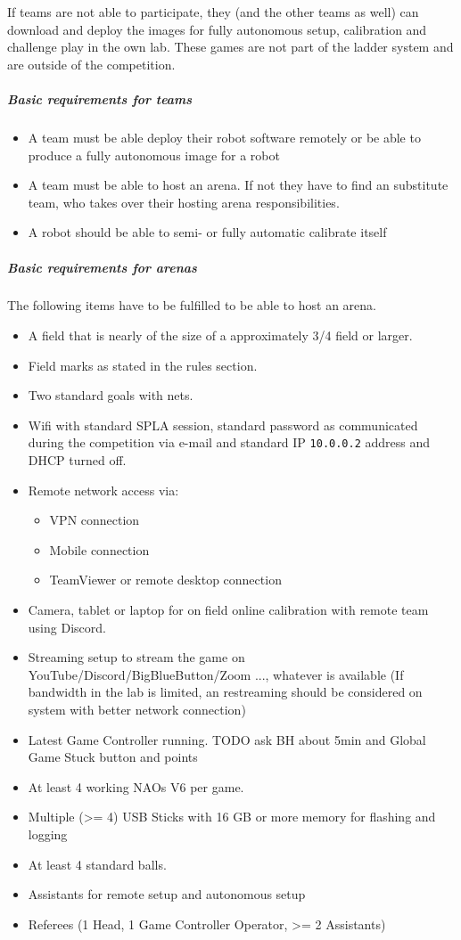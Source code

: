 If teams are not able to participate, they (and the other teams as well) can download and deploy the images for fully autonomous setup, calibration and challenge play in the own lab. These games are not part of the ladder system and are outside of the competition.

\subparagraph*{Basic requirements for teams}

\begin{itemize}
    \item A team must be able deploy their robot software remotely or be able to produce a fully autonomous image for a robot
    \item A team must be able to host an arena. If not they have to find an substitute team, who takes over their hosting arena responsibilities.
    \item A robot should be able to semi- or fully automatic calibrate itself
\end{itemize}

\subparagraph*{Basic requirements for arenas}

The following items have to be fulfilled to be able to host an arena.

\begin{itemize}
    \item A field that is nearly of the size of a approximately 3/4 field or larger.
    \item Field marks as stated in the rules section. 
    \item Two standard goals with nets.
    \item Wifi with standard SPL\textunderscore A session, standard password as communicated during the competition via e-mail and standard IP \texttt{10.0.0.2} address and DHCP turned off.
    \item Remote network access via:
    \begin{itemize}
        \item VPN connection
        \item Mobile connection
        \item TeamViewer or remote desktop connection
    \end{itemize}
    \item Camera, tablet or laptop for on field online calibration with remote team using Discord.
    \item Streaming setup to stream the game on YouTube/Discord/BigBlueButton/Zoom ..., whatever is available (If bandwidth in the lab is limited, an restreaming should be considered on system with better network connection)
    \item Latest Game Controller running. TODO ask BH about 5min and Global Game Stuck button and points 
    \item At least 4 working NAOs V6 per game.
    \item Multiple (>= 4) USB Sticks with 16 GB or more memory for flashing and logging 
    \item At least 4 standard balls.
    \item Assistants for remote setup and autonomous setup
    \item Referees (1 Head, 1 Game Controller Operator, >= 2 Assistants)
\end{itemize}

